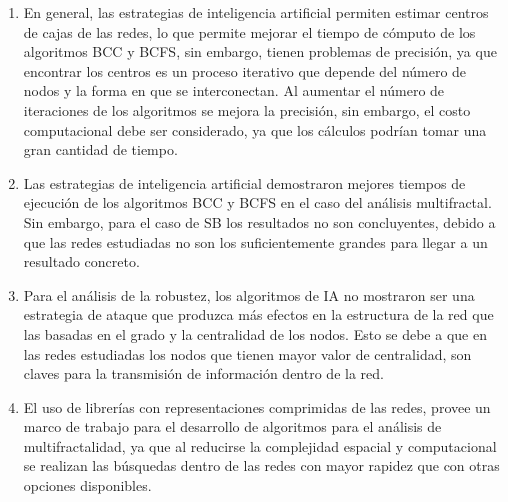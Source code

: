 \begin{enumerate}
    \item En general, las estrategias de inteligencia artificial permiten estimar centros de cajas de las redes, lo que permite mejorar el tiempo de cómputo de los algoritmos BCC y BCFS, sin embargo, tienen problemas de precisión, ya que encontrar los centros es un proceso iterativo que depende del número de nodos y la forma en que se interconectan. Al aumentar el número de iteraciones de los algoritmos se mejora la precisión, sin embargo, el costo computacional debe ser considerado, ya que los cálculos podrían tomar una gran cantidad de tiempo.
    \item Las estrategias de inteligencia artificial demostraron mejores tiempos de ejecución de los algoritmos BCC y BCFS en el caso del análisis multifractal. Sin embargo, para el caso de SB los resultados no son concluyentes, debido a que las redes estudiadas no son los suficientemente grandes para llegar a un resultado concreto.
    \item Para el análisis de la robustez, los algoritmos de IA no mostraron ser una estrategia de ataque que produzca más efectos en la estructura de la red que las basadas en el grado y la centralidad de los nodos. Esto se debe a que en las redes estudiadas los nodos que tienen mayor valor de centralidad, son claves para la transmisión de información dentro de la red.
    \item El uso de librerías con representaciones comprimidas de las redes, provee un marco de trabajo para el desarrollo de algoritmos para el análisis de multifractalidad, ya que al reducirse la complejidad espacial y computacional se realizan las búsquedas dentro de las redes con mayor rapidez que con otras opciones disponibles.
\end{enumerate}